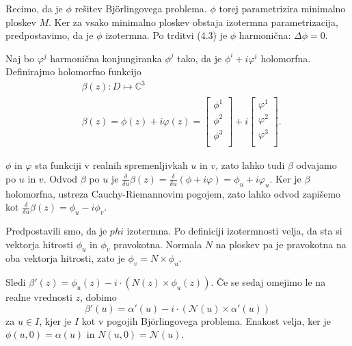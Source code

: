 \documentclass[mat1]{fmfdelo}
\newcommand{\C}{\mathbb C}
\begin{document}
\begin{dokaz}
    Recimo, da je $\phi$ rešitev Björlingovega problema.
    $\phi$ torej parametrizira minimalno ploskev $M$.
    Ker za vsako minimalno ploskev obstaja izotermna parametrizacija, predpostavimo, da je $\phi$ izotermna.
    Po trditvi (4.3) je $\phi$ harmonična: $\Delta \phi = 0$.

    Naj bo $\varphi^{j}$ harmonična konjungiranka $\phi^{j}$ tako, da je $\phi^{i} + i \varphi^{i}$ holomorfna.
    Definirajmo holomorfno funkcijo
    \begin{align*}
        & \beta (z) : D \mapsto \C^3 \\
        & \beta (z) = \phi (z) + i \varphi (z) = \left[
        \begin{matrix}
            \phi^{1} \\
            \phi^{2} \\
            \phi^{3} \\
        \end{matrix} \right]
        + i \left[
        \begin{matrix}
            \varphi^{1} \\
            \varphi^{2} \\
            \varphi^{3} \\
        \end{matrix} \right].
    \end{align*}

    $\phi$ in $\varphi$ sta funkciji v realnih spremenljivkah $u$ in $v$, zato lahko tudi $\beta$ odvajamo po $u$ in $v$.
    Odvod $\beta$ po $u$ je $\frac{\delta}{\delta u} \beta(z) = \frac{\delta}{\delta u} (\phi + i \varphi) = \phi_u + i \varphi_u$.
    Ker je $\beta$ holomorfna, ustreza Cauchy-Riemannovim pogojem, zato lahko odvod zapišemo kot $\frac{\delta}{\delta u} \beta(z) = \phi_u - i \phi_v$.

    Predpostavili smo, da je $phi$ izotermna. Po definiciji izotermnosti velja, da sta si vektorja hitrosti $\phi_u$ in $\phi_v$
    pravokotna. Normala $N$ na ploskev pa je pravokotna na oba vektorja hitrosti, zato je $\phi_v = N \times \phi_u$.

    Sledi $\beta'(z) = \phi_u(z) - i \cdot \left( N(z) \times \phi_u(z) \right)$.
    Če se sedaj omejimo le na realne vrednosti $z$, dobimo 
    $$\beta'(u) = \alpha'(u) - i \cdot \left( \mathcal{N} (u) \times \alpha'(u) \right)$$
    za $u \in I$, kjer je $I$ kot v pogojih Björlingovega problema. Enakost velja, ker je $\phi(u, 0) = \alpha(u)$ in $N(u, 0) = \mathcal{N} (u)$.


\end{dokaz}
\end{document}
